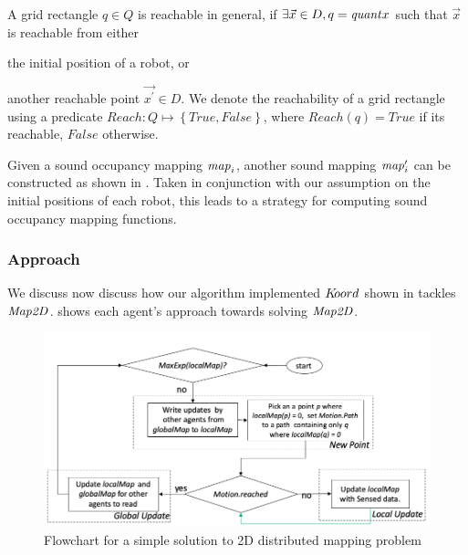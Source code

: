 A grid rectangle $q\in Q$ is reachable in general, if $\exists \Vec{x}\in D, q = \mathit{quant}{x}$ such that $\Vec{x}$ is reachable from either \begin{inparaenum} [(a)]\item the initial position of a robot, or \item another reachable point $\Vec{x^\prime}\in D$. We denote the reachability of a grid rectangle using a predicate $\mathit{Reach} : Q \mapsto \left\{\mathit{True}, \mathit{False}\right\}$, where $\mathit{Reach}(q) = \mathit{True}$ if its reachable,  $\mathit{False}$ otherwise.
\end{inparaenum}


Given a sound occupancy mapping $\mathit{map}_i$, another sound mapping $\mathit{map}_i^\prime$ can be constructed as shown in . Taken in conjunction with our assumption on the initial positions of each robot, this leads to a strategy for computing sound occupancy mapping functions.



\subsubsection{Approach}
We discuss now discuss how our algorithm implemented $K\kern-2pt oord$ shown in  tackles $\mathit{Map2D}$.  shows each agent's approach towards solving $\mathit{Map2D}$.

\begin{figure}[!htbp]
    \centering
    \includegraphics[width=\linewidth]{figs/map_flowchart.png}
    \caption{Flowchart for a simple solution to 2D distributed mapping problem\vspace{-2mm}}
    \label{fig:flowmap}
\end{figure}

